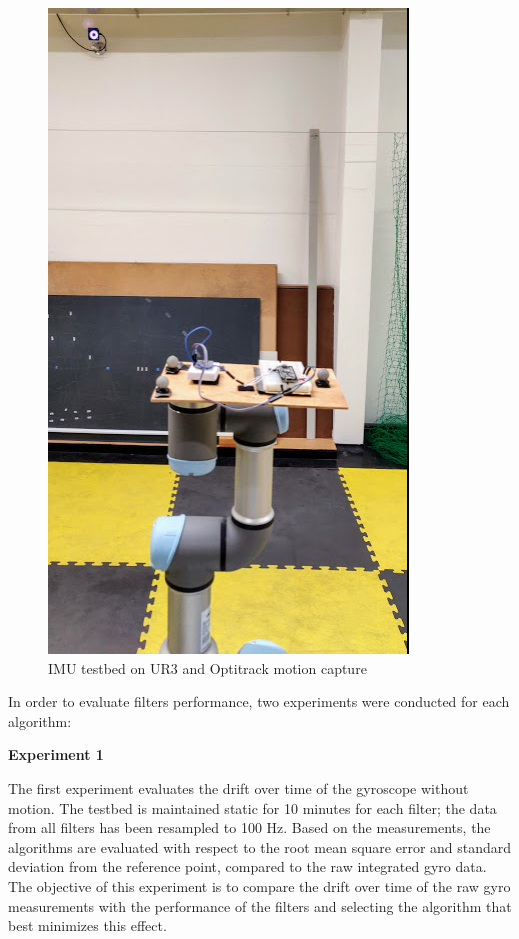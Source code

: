 \begin{figure}[h!]
    \centering
    \includegraphics[scale=0.5]{graphics/Navigation/UR_static.png}
    \caption{IMU testbed on UR3 and Optitrack motion capture}
     \label{fig:IMU testbed}
\end{figure} 


In order to evaluate filters performance, two experiments were conducted for each algorithm:

\textbf{Experiment 1}

The first experiment evaluates the drift over time of the gyroscope without motion. The testbed is maintained static for 10 minutes for each filter; the data from all filters has been resampled to 100 Hz. 
Based on the measurements, the algorithms are evaluated with respect to the root mean square error and standard deviation from the reference point, compared to the raw integrated gyro data. 
The objective of this experiment is to compare the drift over time of the raw gyro measurements with the performance of the filters and selecting the algorithm that best minimizes this effect. 

